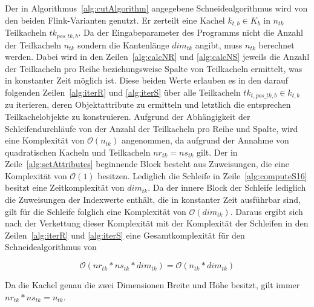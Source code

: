 Der in Algorithmus~\ref{alg:cutAlgorithm} angegebene Schneidealgorithmus wird von den beiden Flink-Varianten genutzt. Er zerteilt eine Kachel $k_{t, b} \in K_{b}$ in $n_{tk}$ Teilkacheln $tk_{pos\_tk, b}$. Da der Eingabeparameter des Programms nicht die Anzahl der Teilkacheln $n_{tk}$ sondern die Kantenlänge $dim_{tk}$ angibt, muss $n_{tk}$ berechnet werden. Dabei wird in den Zeilen~\ref{alg:calcNR} und \ref{alg:calcNS} jeweils die Anzahl der Teilkacheln pro Reihe beziehungsweise Spalte von Teilkacheln ermittelt, was in konstanter Zeit möglich ist. Diese beiden Werte erlauben es in den darauf folgenden Zeilen~\ref{alg:iterR} und \ref{alg:iterS} über alle Teilkacheln $tk_{t, pos\_tk, b} \in k_{t, b}$ zu iterieren, deren Objektattribute zu ermitteln und letztlich die entsprechen Teilkachelobjekte zu konstruieren. Aufgrund der Abhängigkeit der Schleifendurchläufe von der Anzahl der Teilkacheln pro Reihe und Spalte, wird eine Komplexität von $\mathcal{O}(n_{tk})$ angenommen, da aufgrund der Annahme von quadratischen Kacheln und Teilkacheln $nr_{tk} = ns_{tk}$ gilt. Der in Zeile~\ref{alg:setAttributes} beginnende Block besteht aus Zuweisungen, die eine Komplexität von $\mathcal{O}(1)$ besitzen. Lediglich die Schleife in Zeile~\ref{alg:computeS16} besitzt eine Zeitkomplexität von $dim_{tk}$. Da der innere Block der Schleife lediglich die Zuweisungen der Indexwerte enthält, die in konstanter Zeit ausführbar sind, gilt für die Schleife folglich eine Komplexität von $\mathcal{O}(dim_{tk})$. Daraus ergibt sich nach der Verkettung dieser Komplexität mit der Komplexität der Schleifen in den Zeilen~\ref{alg:iterR} und \ref{alg:iterS} eine Gesamtkomplexität für den Schneidealgorithmus von 

\begin{equation} \label{eq:complexityCut}
\mathcal{O}(nr_{tk} * ns_{tk} * dim_{tk}) = \mathcal{O}(n_{tk} * dim_{tk})
\end{equation}

Da die Kachel genau die zwei Dimensionen Breite und Höhe besitzt, gilt immer $nr_{tk} * ns_{tk} = n_{tk}$. 

